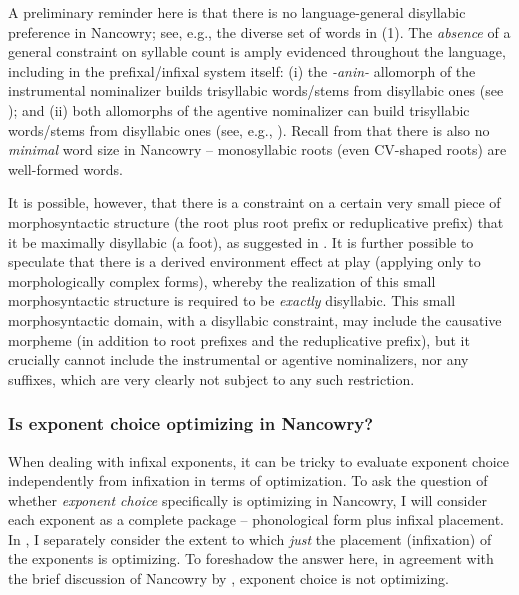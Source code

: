 \documentclass[output=paper]{langscibook}
\begin{document}
A preliminary reminder here is that there is no language-general disyllabic preference in Nancowry; see, e.g., the diverse set of words in (1). The \textit{absence} of a general constraint on syllable count is amply evidenced throughout the language, including in the prefixal/infixal system itself: (i) the \textit{-anin-} allomorph of the instrumental nominalizer builds trisyllabic words/stems from disyllabic ones (see ); and (ii) both allomorphs of the agentive nominalizer can build trisyllabic words/stems from disyllabic ones (see, e.g., ). Recall from  that there is also no \textit{minimal} word size in Nancowry -- monosyllabic roots (even CV-shaped roots) are well-formed words. 

It is possible, however,  that there is a constraint on a certain very small piece of morphosyntactic structure (the root plus root prefix or reduplicative prefix) that it be maximally disyllabic (a foot), as suggested in . It is further possible to speculate that there is a derived environment effect at play (applying only to morphologically complex forms),  whereby the realization of this small  morphosyntactic structure is required to be \textit{exactly} disyllabic. This small morphosyntactic domain, with a disyllabic constraint, may include the causative morpheme (in addition to root prefixes and the reduplicative prefix), but it crucially cannot include the instrumental or agentive nominalizers, nor any suffixes, which are very clearly not subject to any such restriction.


\subsubsection{Is exponent choice optimizing in Nancowry?}\label{sec:kalin:4.3.1}

When dealing with infixal exponents, it can be tricky to evaluate exponent choice independently from infixation in terms of optimization. To ask the question of whether \textit{exponent choice} specifically is optimizing in Nancowry, I will consider each exponent as a complete package -- phonological form plus infixal placement. In , I separately consider the extent to which \textit{just} the placement (infixation) of the exponents is optimizing. To foreshadow the answer here, in agreement with the brief discussion of Nancowry by \citet[167--168]{Paster06}, exponent choice is not optimizing.
\end{document}
